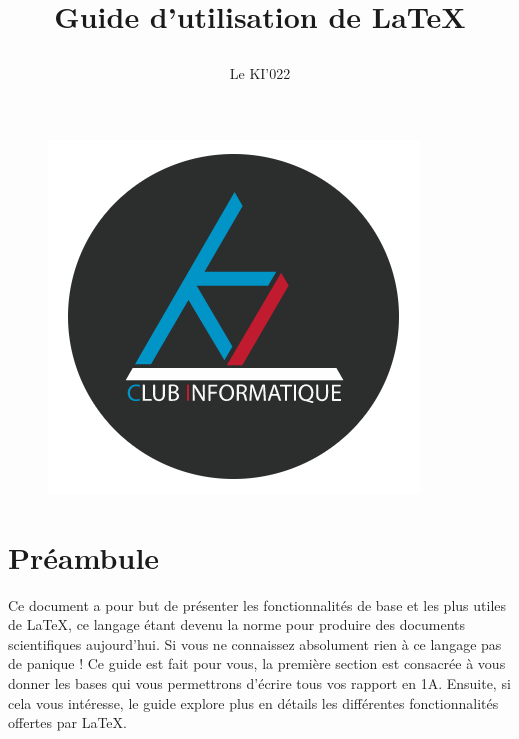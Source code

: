 \documentclass[11pt]{article}				%
\title{\textbf{Guide d'utilisation de \LaTeX}
\author{Le KI'022}
\date{}
}
\begin{document}
\maketitle

\begin{figure}[h]
\begin{center}
\includegraphics[scale=0.5]{ressources/KI.png}
\end{center}
\end{figure}

\section*{Préambule}

Ce document a pour but de présenter les fonctionnalités de base et les plus utiles de LaTeX, ce langage étant devenu la norme pour produire des documents scientifiques aujourd'hui. Si vous ne connaissez absolument rien à ce langage pas de panique ! Ce guide est fait pour vous, la première section est consacrée à vous donner les bases qui vous permettrons d'écrire tous vos rapport en 1A. Ensuite, si cela vous intéresse, le guide explore plus en détails les différentes fonctionnalités offertes par LaTeX.\\
\end{document}

